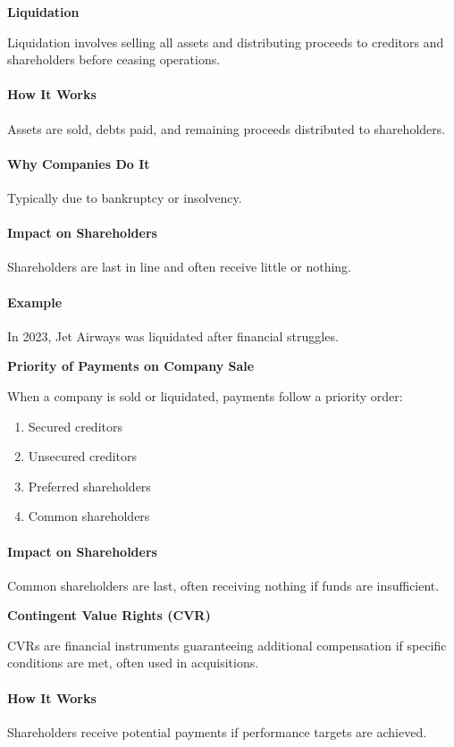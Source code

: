 \documentclass[12pt]{article}
\begin{document}
\textbf{Liquidation}

Liquidation involves selling all assets and distributing proceeds to creditors and shareholders before ceasing operations.

\paragraph{How It Works}
Assets are sold, debts paid, and remaining proceeds distributed to shareholders.

\paragraph{Why Companies Do It}
Typically due to bankruptcy or insolvency.

\paragraph{Impact on Shareholders}
Shareholders are last in line and often receive little or nothing.

\paragraph{Example}
In 2023, Jet Airways was liquidated after financial struggles.

\textbf{Priority of Payments on Company Sale}

When a company is sold or liquidated, payments follow a priority order:

\begin{enumerate}
    \item Secured creditors
    \item Unsecured creditors
    \item Preferred shareholders
    \item Common shareholders
\end{enumerate}

\paragraph{Impact on Shareholders}
Common shareholders are last, often receiving nothing if funds are insufficient.

\textbf{Contingent Value Rights (CVR)}

CVRs are financial instruments guaranteeing additional compensation if specific conditions are met, often used in acquisitions.

\paragraph{How It Works}
Shareholders receive potential payments if performance targets are achieved.
\end{document}
